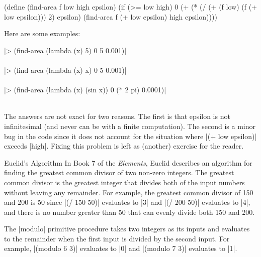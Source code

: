 \begin{schemeregion}
\begin{exercise}
{\begin{schemedisplay}
(define (find-area f low high epsilon)
  (if (>= low high)
      0
      (+ (* (/ (+ (f low) (f (+ low epsilon))) 2) epsilon)
         (find-area f (+ low epsilon) high epsilon))))
\end{schemedisplay}
Here are some examples:
\begin{code}
\scheme|> (find-area (lambda (x) 5) 0 5 0.001)|\\
\\
\scheme|> (find-area (lambda (x) x) 0 5 0.001)|\\
\\
\scheme|> (find-area (lambda (x) (sin x)) 0 (* 2 pi) 0.0001)|\\
\\
\end{code}
The answers are not exact for two reasons.  The first is that epsilon is not infinitesimal (and never can be with a finite computation).  The second is a minor bug in the code since it does not account for the situation where \scheme|(+ low epsilon)| exceeds \scheme|high|.  Fixing this problem is left as (another) exercise for the reader.
}
\end{exercise}
\afterex

\begin{examplenobar}{Euclid's Algorithm\label{ex:gcd}} In Book 7 of the \emph{Elements}, Euclid describes an algorithm for finding the greatest common divisor of two non-zero integers.  The greatest common divisor is the greatest integer that divides both of the input numbers without leaving any remainder.  For example, the greatest common divisor of 150 and 200 is 50 since \scheme|(/ 150 50)| evaluates to \schemeresult|3| and \scheme|(/ 200 50)| evaluates to \schemeresult|4|, and there is no number greater than 50 that can evenly divide both 150 and 200.  

 The \scheme|modulo| primitive procedure takes two integers as its inputs and evaluates to the remainder when the first input is divided by the second input.  For example, \scheme|(modulo 6 3)| evaluates to \schemeresult|0| and \scheme|(modulo 7 3)| evaluates to \schemeresult|1|.


\end{examplenobar}
\end{schemeregion}
